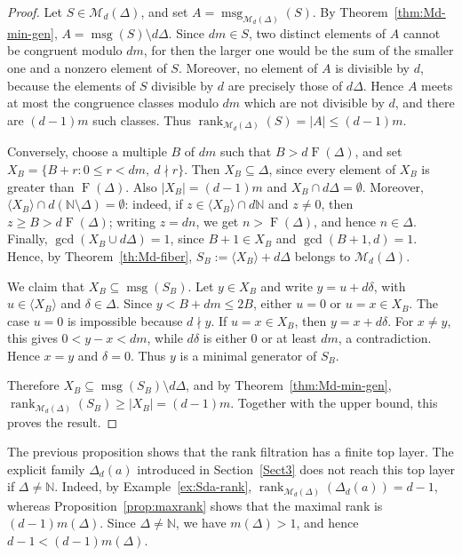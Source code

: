 \documentclass[12pt,a4paper]{amsart}
\theoremstyle{definition}
\theoremstyle{remark}
\begin{document}
\begin{proof}
Let \(S\in\mathcal{M}_d(\Delta)\), and set
\(A=\operatorname{msg}_{\mathcal{M}_d(\Delta)}(S)\). By Theorem~\ref{thm:Md-min-gen},
\(A=\operatorname{msg}(S)\setminus d\Delta\). Since \(dm\in S\), two distinct elements
of \(A\) cannot be congruent modulo \(dm\), for then the larger one would be the sum of
the smaller one and a nonzero element of \(S\). Moreover, no element of \(A\) is divisible
by \(d\), because the elements of \(S\) divisible by \(d\) are precisely those of \(d\Delta\).
Hence \(A\) meets at most the congruence classes modulo \(dm\) which are not divisible
by \(d\), and there are \((d-1)m\) such classes. Thus
\(\operatorname{rank}_{\mathcal{M}_d(\Delta)}(S)=|A|\le (d-1)m\).

Conversely, choose a multiple \(B\) of \(dm\) such that \(B>d\operatorname{F}(\Delta)\), and set
\(X_B=\{B+r:0\le r<dm,\ d\nmid r\}\). Then \(X_B\subseteq\Delta\), since every
element of \(X_B\) is greater than \(\operatorname{F}(\Delta)\). Also \(|X_B|=(d-1)m\) and
\(X_B\cap d\Delta=\emptyset\). Moreover,
\(\langle X_B\rangle\cap d(\mathbb N\setminus\Delta)=\emptyset\): indeed, if
\(z\in\langle X_B\rangle\cap d\mathbb N\) and \(z\ne0\), then \(z\ge B>d\operatorname{F}(\Delta)\);
writing \(z=dn\), we get \(n>\operatorname{F}(\Delta)\), and hence \(n\in\Delta\). Finally,
\(\gcd(X_B\cup d\Delta)=1\), since \(B+1\in X_B\) and \(\gcd(B+1,d)=1\).
Hence, by Theorem~\ref{th:Md-fiber}, \(S_B:=\langle X_B\rangle+d\Delta\) belongs to
\(\mathcal{M}_d(\Delta)\).

We claim that \(X_B\subseteq\operatorname{msg}(S_B)\). Let \(y\in X_B\) and write
\(y=u+d\delta\), with \(u\in\langle X_B\rangle\) and \(\delta\in\Delta\). Since
\(y<B+dm\le 2B\), either \(u=0\) or \(u=x\in X_B\). The case \(u=0\) is impossible
because \(d\nmid y\). If \(u=x\in X_B\), then \(y=x+d\delta\). For \(x\ne y\), this
gives \(0<y-x<dm\), while \(d\delta\) is either \(0\) or at least \(dm\), a contradiction.
Hence \(x=y\) and \(\delta=0\). Thus \(y\) is a minimal generator of \(S_B\).

Therefore \(X_B\subseteq\operatorname{msg}(S_B)\setminus d\Delta\), and by
Theorem~\ref{thm:Md-min-gen},
\(\operatorname{rank}_{\mathcal{M}_d(\Delta)}(S_B)\ge |X_B|=(d-1)m\). Together with
the upper bound, this proves the result.
\end{proof}

The previous proposition shows that the rank filtration has a finite top
layer. The explicit family \(\Delta_d(a)\) introduced in
Section~\ref{Sect3} does not reach this top layer if
\(\Delta\ne\mathbb N\). Indeed, by Example~\ref{ex:Sda-rank},
\(\operatorname{rank}_{\mathcal{M}_d(\Delta)}(\Delta_d(a))=d-1\), whereas
Proposition~\ref{prop:maxrank} shows that the maximal rank is
\((d-1)m(\Delta)\). Since \(\Delta\ne\mathbb N\), we have
\(m(\Delta)>1\), and hence \(d-1 < (d-1)m(\Delta)\).
\end{document}

